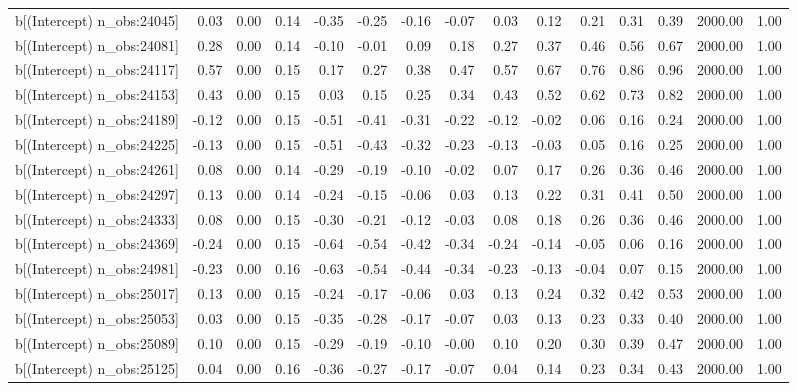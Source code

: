 \begin{table}[ht]
\begin{tabular}{rrrrrrrrrrrrrrr}
  b[(Intercept) n\_obs:24045] & 0.03 & 0.00 & 0.14 & -0.35 & -0.25 & -0.16 & -0.07 & 0.03 & 0.12 & 0.21 & 0.31 & 0.39 & 2000.00 & 1.00 \\ 
  b[(Intercept) n\_obs:24081] & 0.28 & 0.00 & 0.14 & -0.10 & -0.01 & 0.09 & 0.18 & 0.27 & 0.37 & 0.46 & 0.56 & 0.67 & 2000.00 & 1.00 \\ 
  b[(Intercept) n\_obs:24117] & 0.57 & 0.00 & 0.15 & 0.17 & 0.27 & 0.38 & 0.47 & 0.57 & 0.67 & 0.76 & 0.86 & 0.96 & 2000.00 & 1.00 \\ 
  b[(Intercept) n\_obs:24153] & 0.43 & 0.00 & 0.15 & 0.03 & 0.15 & 0.25 & 0.34 & 0.43 & 0.52 & 0.62 & 0.73 & 0.82 & 2000.00 & 1.00 \\ 
  b[(Intercept) n\_obs:24189] & -0.12 & 0.00 & 0.15 & -0.51 & -0.41 & -0.31 & -0.22 & -0.12 & -0.02 & 0.06 & 0.16 & 0.24 & 2000.00 & 1.00 \\ 
  b[(Intercept) n\_obs:24225] & -0.13 & 0.00 & 0.15 & -0.51 & -0.43 & -0.32 & -0.23 & -0.13 & -0.03 & 0.05 & 0.16 & 0.25 & 2000.00 & 1.00 \\ 
  b[(Intercept) n\_obs:24261] & 0.08 & 0.00 & 0.14 & -0.29 & -0.19 & -0.10 & -0.02 & 0.07 & 0.17 & 0.26 & 0.36 & 0.46 & 2000.00 & 1.00 \\ 
  b[(Intercept) n\_obs:24297] & 0.13 & 0.00 & 0.14 & -0.24 & -0.15 & -0.06 & 0.03 & 0.13 & 0.22 & 0.31 & 0.41 & 0.50 & 2000.00 & 1.00 \\ 
  b[(Intercept) n\_obs:24333] & 0.08 & 0.00 & 0.15 & -0.30 & -0.21 & -0.12 & -0.03 & 0.08 & 0.18 & 0.26 & 0.36 & 0.46 & 2000.00 & 1.00 \\ 
  b[(Intercept) n\_obs:24369] & -0.24 & 0.00 & 0.15 & -0.64 & -0.54 & -0.42 & -0.34 & -0.24 & -0.14 & -0.05 & 0.06 & 0.16 & 2000.00 & 1.00 \\ 
  b[(Intercept) n\_obs:24981] & -0.23 & 0.00 & 0.16 & -0.63 & -0.54 & -0.44 & -0.34 & -0.23 & -0.13 & -0.04 & 0.07 & 0.15 & 2000.00 & 1.00 \\ 
  b[(Intercept) n\_obs:25017] & 0.13 & 0.00 & 0.15 & -0.24 & -0.17 & -0.06 & 0.03 & 0.13 & 0.24 & 0.32 & 0.42 & 0.53 & 2000.00 & 1.00 \\ 
  b[(Intercept) n\_obs:25053] & 0.03 & 0.00 & 0.15 & -0.35 & -0.28 & -0.17 & -0.07 & 0.03 & 0.13 & 0.23 & 0.33 & 0.40 & 2000.00 & 1.00 \\ 
  b[(Intercept) n\_obs:25089] & 0.10 & 0.00 & 0.15 & -0.29 & -0.19 & -0.10 & -0.00 & 0.10 & 0.20 & 0.30 & 0.39 & 0.47 & 2000.00 & 1.00 \\ 
  b[(Intercept) n\_obs:25125] & 0.04 & 0.00 & 0.16 & -0.36 & -0.27 & -0.17 & -0.07 & 0.04 & 0.14 & 0.23 & 0.34 & 0.43 & 2000.00 & 1.00 \\ 

\end{tabular}
\end{table}
